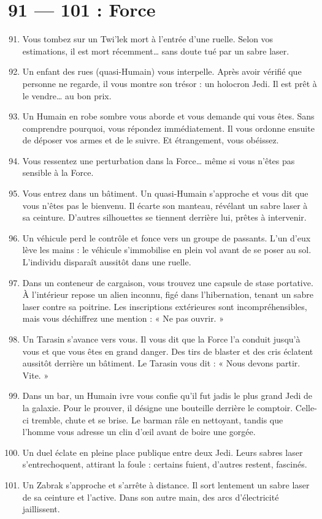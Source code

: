 \documentclass{article}
\begin{document}
\section*{91 --- 101 : Force}
\begin{enumerate}
	\setcounter{enumi}{90}
	\item Vous tombez sur un Twi’lek mort à l’entrée d’une ruelle. Selon vos estimations, il est mort récemment… sans doute tué par un sabre laser.
	\item Un enfant des rues (quasi-Humain) vous interpelle. Après avoir vérifié que personne ne regarde, il vous montre son trésor : un holocron Jedi. Il est prêt à le vendre… au bon prix.
	\item Un Humain en robe sombre vous aborde et vous demande qui vous êtes. Sans comprendre pourquoi, vous répondez immédiatement. Il vous ordonne ensuite de déposer vos armes et de le suivre. Et étrangement, vous obéissez.
	\item Vous ressentez une perturbation dans la Force… même si vous n’êtes pas sensible à la Force.
	\item Vous entrez dans un bâtiment. Un quasi-Humain s’approche et vous dit que vous n’êtes pas le bienvenu. Il écarte son manteau, révélant un sabre laser à sa ceinture. D’autres silhouettes se tiennent derrière lui, prêtes à intervenir.
	\item Un véhicule perd le contrôle et fonce vers un groupe de passants. L’un d’eux lève les mains : le véhicule s’immobilise en plein vol avant de se poser au sol. L’individu disparaît aussitôt dans une ruelle.
	\item Dans un conteneur de cargaison, vous trouvez une capsule de stase portative. À l’intérieur repose un alien inconnu, figé dans l’hibernation, tenant un sabre laser contre sa poitrine. Les inscriptions extérieures sont incompréhensibles, mais vous déchiffrez une mention : « Ne pas ouvrir. »
	\item Un Tarasin s’avance vers vous. Il vous dit que la Force l’a conduit jusqu’à vous et que vous êtes en grand danger. Des tirs de blaster et des cris éclatent aussitôt derrière un bâtiment. Le Tarasin vous dit : « Nous devons partir. Vite. »
	\item Dans un bar, un Humain ivre vous confie qu’il fut jadis le plus grand Jedi de la galaxie. Pour le prouver, il désigne une bouteille derrière le comptoir. Celle-ci tremble, chute et se brise. Le barman râle en nettoyant, tandis que l’homme vous adresse un clin d’œil avant de boire une gorgée.
	\item Un duel éclate en pleine place publique entre deux Jedi. Leurs sabres laser s’entrechoquent, attirant la foule : certains fuient, d’autres restent, fascinés.
	\item Un Zabrak s’approche et s’arrête à distance. Il sort lentement un sabre laser de sa ceinture et l’active. Dans son autre main, des arcs d’électricité jaillissent.
\end{enumerate}
\end{document}

